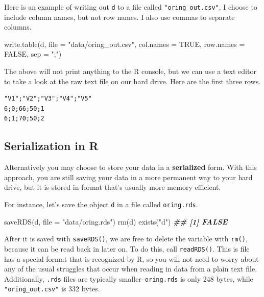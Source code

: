 \documentclass[
  12pt,
  krantz2]{krantz}
\makeatletter
\newenvironment{Shaded}{\begin{snugshade}}{\end{snugshade}}
\newcommand{\AttributeTok}[1]{\textcolor[rgb]{0.61,0.61,0.61}{#1}}
\newcommand{\ConstantTok}[1]{\textcolor[rgb]{0,0,0}{#1}}
\newcommand{\DocumentationTok}[1]{\textcolor[rgb]{0.37,0.37,0.37}{\textbf{\textit{#1}}}}
\newcommand{\FunctionTok}[1]{\textcolor[rgb]{0,0,0}{#1}}
\newcommand{\NormalTok}[1]{#1}
\newcommand{\StringTok}[1]{\textcolor[rgb]{0.5,0.5,0.5}{#1}}
\newenvironment{kframe}{%
\medskip{}
\setlength{\fboxsep}{.8em}
 \def\at@end@of@kframe{}%
 \ifinner\ifhmode%
  \def\at@end@of@kframe{\end{minipage}}%
  \begin{minipage}{\columnwidth}%
 \fi\fi%
 \def\FrameCommand##1{\hskip\@totalleftmargin \hskip-\fboxsep
 \colorbox{shadecolor}{##1}\hskip-\fboxsep
     \hskip-\linewidth \hskip-\@totalleftmargin \hskip\columnwidth}%
 \MakeFramed {\advance\hsize-\width
   \@totalleftmargin\z@ \linewidth\hsize
   \@setminipage}}%
 {\par\unskip\endMakeFramed%
 \at@end@of@kframe}
\renewenvironment{Shaded}{\begin{kframe}}{\end{kframe}}
\makeatother
\begin{document}
Here is an example of writing out \texttt{d} to a file called \texttt{"oring\_out.csv"}. I choose to include column names, but not row names. I also use commas to separate columns.

\begin{Shaded}
\begin{Highlighting}[]
\FunctionTok{write.table}\NormalTok{(d, }\AttributeTok{file =} \StringTok{"data/oring\_out.csv"}\NormalTok{, }
            \AttributeTok{col.names =} \ConstantTok{TRUE}\NormalTok{, }\AttributeTok{row.names =} \ConstantTok{FALSE}\NormalTok{, }\AttributeTok{sep =} \StringTok{";"}\NormalTok{)}
\end{Highlighting}
\end{Shaded}

The above will not print anything to the R console, but we can use a text editor to take a look at the raw text file on our hard drive. Here are the first three rows.

\begin{verbatim}
"V1";"V2";"V3";"V4";"V5"
6;0;66;50;1
6;1;70;50;2
\end{verbatim}

\hypertarget{serialization-in-r}{%
\subsection{Serialization in R}\label{serialization-in-r}}

Alternatively you may choose to store your data in a \textbf{serialized} form. With this approach, you are still saving your data in a more permanent way to your hard drive, but it is stored in format that's usually more memory efficient.

For instance, let's save the object \texttt{d} in a file called \texttt{oring.rds}.

\begin{Shaded}
\begin{Highlighting}[]
\FunctionTok{saveRDS}\NormalTok{(d, }\AttributeTok{file =} \StringTok{"data/oring.rds"}\NormalTok{)}
\FunctionTok{rm}\NormalTok{(d)}
\FunctionTok{exists}\NormalTok{(}\StringTok{"d"}\NormalTok{)}
\DocumentationTok{\#\# [1] FALSE}
\end{Highlighting}
\end{Shaded}

After it is saved with \texttt{saveRDS()}, we are free to delete the variable with \texttt{rm()}, because it can be read back in later on. To do this, call \texttt{readRDS()}. This is file has a special format that is recognized by R, so you will not need to worry about any of the usual struggles that occur when reading in data from a plain text file. Additionally, \texttt{.rds} files are typically smaller--\texttt{oring.rds} is only 248 bytes, while \texttt{"oring\_out.csv"} is 332 bytes.
\end{document}
